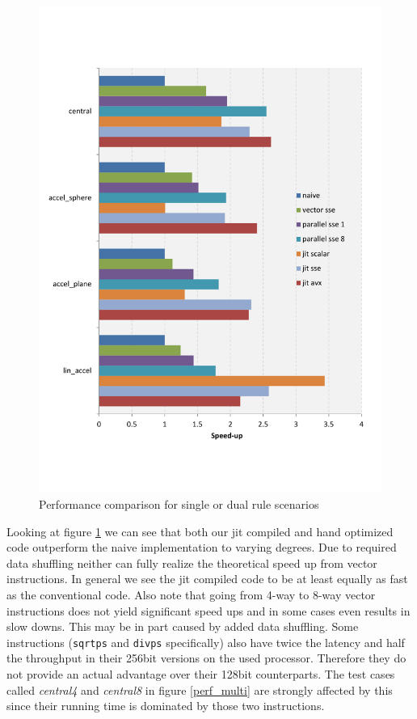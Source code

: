 \begin{figure}[th]\centering
  \includegraphics[scale=0.6]{single_dual_rules.pdf}
  \caption{Performance comparison for single or dual rule scenarios
  \label{perf_single}}
\end{figure}

Looking at figure \ref{perf_single} we can see that both our jit compiled and hand optimized code outperform the naive implementation to varying degrees. Due to required data shuffling neither can fully realize the theoretical speed up from vector instructions. In general we see the jit compiled code to be at least equally as fast as the conventional code. Also note that going from 4-way to 8-way vector instructions does not yield significant speed ups and in some cases even results in slow downs. This may be in part caused by added data shuffling. Some instructions (\texttt{sqrtps} and \texttt{divps} specifically) also have twice the latency and half the throughput in their 256bit versions on the used processor. Therefore they do not provide an actual advantage over their 128bit counterparts. The test cases called \emph{central4} and \emph{central8} in figure \ref{perf_multi} are strongly affected by this since their running time is dominated by those two instructions.

